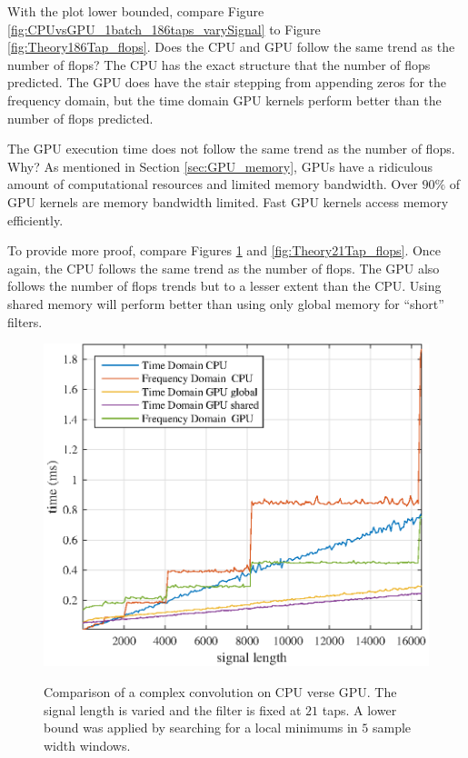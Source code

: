 With the plot lower bounded, compare Figure \ref{fig:CPUvsGPU_1batch_186taps_varySignal} to Figure \ref{fig:Theory186Tap_flops}.
Does the CPU and GPU follow the same trend as the number of flops?
The CPU has the exact structure that the number of flops predicted.
The GPU does have the stair stepping from appending zeros for the frequency domain, but the time domain GPU kernels perform better than the number of flops predicted.

The GPU execution time does not follow the same trend as the number of flops.
Why? As mentioned in Section \ref{sec:GPU_memory}, GPUs have a ridiculous amount of computational resources and limited memory bandwidth.
Over $90\%$ of GPU kernels are memory bandwidth limited.
Fast GPU kernels access memory efficiently.

To provide more proof, compare Figures \ref{fig:CPUvsGPU_1batch_21taps_varySignal} and \ref{fig:Theory21Tap_flops}.
Once again, the CPU follows the same trend as the number of flops.
The GPU also follows the number of flops trends but to a lesser extent than the CPU.
Using shared memory will perform better than using only global memory for ``short'' filters.
\begin{figure}
	\centering\includegraphics[width=5in]{figures/gpu_intro/CPUvsGPU_1batch_21taps_varySignal.eps}
	\label{fig:CPUvsGPU_1batch_21taps_varySignal}
	\caption{Comparison of a complex convolution on CPU verse GPU. The signal length is varied and the filter is fixed at $21$ taps. A lower bound was applied by searching for a local minimums in $5$ sample width windows.}
\end{figure}

